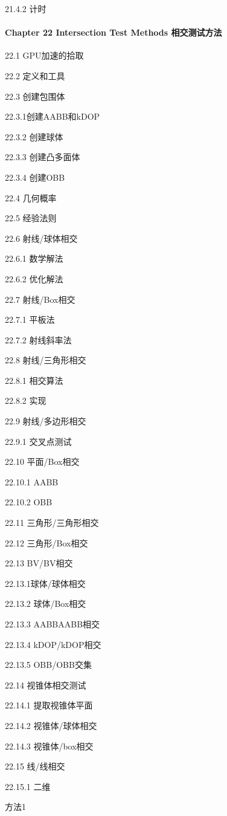 \documentclass[
  paper=a4,
  ,captions=tableheading
]{scrartcl}
\begin{document}
21.4.2 计时

\paragraph{Chapter 22 Intersection Test Methods
相交测试方法}\label{chapter-22-intersection-test-methods-ux76f8ux4ea4ux6d4bux8bd5ux65b9ux6cd5}

22.1 GPU加速的拾取

22.2 定义和工具

22.3 创建包围体

22.3.1创建AABB和kDOP

22.3.2 创建球体

22.3.3 创建凸多面体

22.3.4 创建OBB

22.4 几何概率

22.5 经验法则

22.6 射线/球体相交

22.6.1 数学解法

22.6.2 优化解法

22.7 射线/Box相交

22.7.1 平板法

22.7.2 射线斜率法

22.8 射线/三角形相交

22.8.1 相交算法

22.8.2 实现

22.9 射线/多边形相交

22.9.1 交叉点测试

22.10 平面/Box相交

22.10.1 AABB

22.10.2 OBB

22.11 三角形/三角形相交

22.12 三角形/Box相交

22.13 BV/BV相交

22.13.1球体/球体相交

22.13.2 球体/Box相交

22.13.3 AABBAABB相交

22.13.4 kDOP/kDOP相交

22.13.5 OBB/OBB交集

22.14 视锥体相交测试

22.14.1 提取视锥体平面

22.14.2 视锥体/球体相交

22.14.3 视锥体/box相交

22.15 线/线相交

22.15.1 二维

方法1
\end{document}
